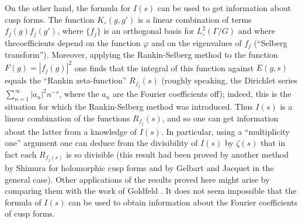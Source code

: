 On the other hand, the formula for $I(s)$ can be used to get information about cusp forms. The function $K_\circ (g,g')$ is a linear combination of terms $f_j (g) f_j (g')$, where $\{f_j\}$ is an orthogonal basis for $L^2_\circ (\Gamma / G)$ and where the\pageoriginale coefficients depend on the function $\varphi$ and on the eigenvalues of $f_j$ (``Selberg transform''). Moreover, applying the Rankin-Selberg method to the function $F(g) = |f_j (g)|^2$ one finds that the integral of this function against $E (g,s)$ equals the ``Rankin zeta-function'' $R_{f_j}(s)$ (roughly speaking, the Dirichlet series $\sum\limits^\infty_{n=1} |a_n|^2n^{-s}$, where the $a_n$ are the Fourier coefficients off); indeed, this is the situation for which the Rankin-Selberg method was introduced. Thus $I(s)$ is a linear combination of the functions $R_{f_j}(s)$, and so one can get information about the latter from a knowledge of $I(s)$. In particular, using a ``multiplicity one'' argument one can deduce from the divisibility of $I(s)$ by $\zeta(s)$ that in fact each $R_{f_j(s)}$ is so divisible (this result had been proved by another method by Shimura \cite{art11-8} for holomorphic cusp forms and by Gelbart and Jacquet \cite{art11-2} in the general case). Other applications of the results proved here might arise by comparing them with the work of Goldfeld \cite{art11-1}. It does not seem impossible that the formula of $I(s)$ can be used to obtain information about the Fourier coefficients of cusp forms.

